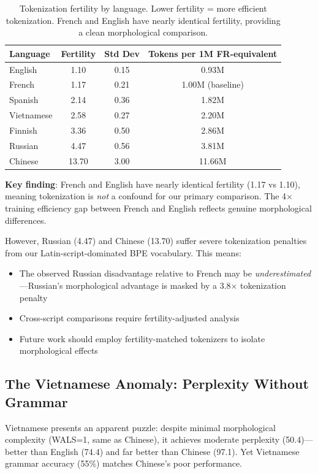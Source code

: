 \documentclass[11pt]{article}
\begin{document}
\begin{table}[h]
\centering
\begin{tabular}{lccc}
\toprule
Language & Fertility & Std Dev & Tokens per 1M FR-equivalent \\
\midrule
English & 1.10 & 0.15 & 0.93M \\
French & 1.17 & 0.21 & 1.00M (baseline) \\
Spanish & 2.14 & 0.36 & 1.82M \\
Vietnamese & 2.58 & 0.27 & 2.20M \\
Finnish & 3.36 & 0.50 & 2.86M \\
Russian & 4.47 & 0.56 & 3.81M \\
Chinese & 13.70 & 3.00 & 11.66M \\
\bottomrule
\end{tabular}
\caption{Tokenization fertility by language. Lower fertility = more efficient tokenization. French and English have nearly identical fertility, providing a clean morphological comparison.}
\label{tab:fertility}
\end{table}

\textbf{Key finding}: French and English have nearly identical fertility (1.17 vs 1.10), meaning tokenization is \textit{not} a confound for our primary comparison. The 4× training efficiency gap between French and English reflects genuine morphological differences.

However, Russian (4.47) and Chinese (13.70) suffer severe tokenization penalties from our Latin-script-dominated BPE vocabulary. This means:
\begin{itemize}
    \item The observed Russian disadvantage relative to French may be \textit{underestimated}—Russian's morphological advantage is masked by a 3.8× tokenization penalty
    \item Cross-script comparisons require fertility-adjusted analysis
    \item Future work should employ fertility-matched tokenizers to isolate morphological effects
\end{itemize}

\subsection{The Vietnamese Anomaly: Perplexity Without Grammar}

Vietnamese presents an apparent puzzle: despite minimal morphological complexity (WALS=1, same as Chinese), it achieves moderate perplexity (50.4)—better than English (74.4) and far better than Chinese (97.1). Yet Vietnamese grammar accuracy (55\%) matches Chinese's poor performance.
\end{document}
